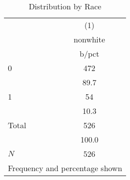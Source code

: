 \begin{table}[htbp]\centering
\def\sym#1{\ifmmode^{#1}\else\(^{#1}\)\fi}
\caption{Distribution by Race}
\begin{tabular}{l*{1}{c}}
\toprule
            &\multicolumn{1}{c}{(1)}\\
            &\multicolumn{1}{c}{nonwhite}\\
            &       b/pct\\
\midrule
0           &         472\\
            &        89.7\\
1           &          54\\
            &        10.3\\
Total       &         526\\
            &       100.0\\
\midrule
\(N\)       &         526\\
\bottomrule
\multicolumn{2}{l}{\footnotesize Frequency and percentage shown}\\
\end{tabular}
\end{table}
